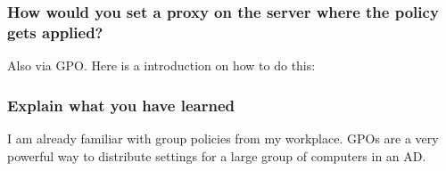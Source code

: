 \subsubsection{How would you set a proxy on the server where the policy gets applied?}
Also via GPO. Here is a introduction on how to do this:

\subsubsection{Explain what you have learned}
I am already familiar with group policies from my workplace. GPOs are a very powerful way to distribute settings for a large group of computers in an AD.